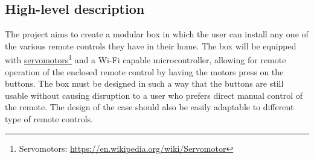 \documentclass[12pt, a4paper, openany]{article}
\newcommand{\footlink}[2]{\href{#2}{#1}\footnote{{\MakeUppercase #1}: \url{#2}}}
\begin{document}
\begin{minipage}[t]{0.31\textwidth}
  \centering{}
\end{minipage}

\vspace{-10pt}

\subsection*{High-level description}

The project aims to create a modular box in which the user can install any one of the various remote controls they have in their home.
The box will be equipped with \footlink{servomotors}{https://en.wikipedia.org/wiki/Servomotor} and a Wi-Fi capable microcontroller, allowing for remote operation of the enclosed remote control by having the motors press on the buttons.
The box must be designed in such a way that the buttons are still usable without causing disruption to a user who prefers direct manual control of the remote.
The design of the case should also be easily adaptable to different type of remote controls.
\end{document}

